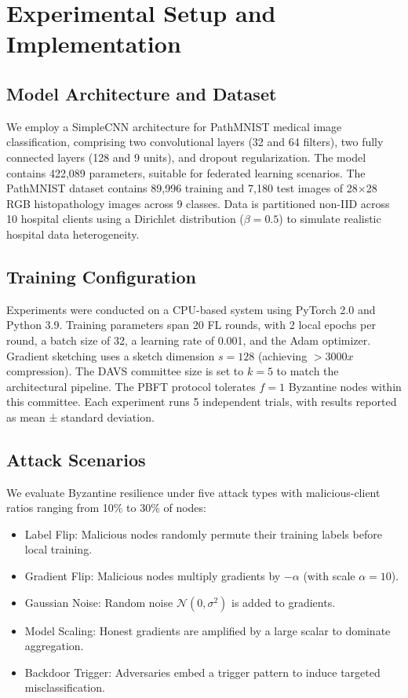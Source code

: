 \documentclass[conference]{IEEEtran}
\begin{document}
\section{Experimental Setup and Implementation}

\subsection{Model Architecture and Dataset}
We employ a SimpleCNN architecture for PathMNIST medical image classification, comprising two convolutional layers (32 and 64 filters), two fully connected layers (128 and 9 units), and dropout regularization. The model contains 422,089 parameters, suitable for federated learning scenarios. The PathMNIST dataset contains 89,996 training and 7,180 test images of 28$\times$28 RGB histopathology images across 9 classes. Data is partitioned non-IID across 10 hospital clients using a Dirichlet distribution ($\beta=0.5$) to simulate realistic hospital data heterogeneity.

\subsection{Training Configuration}
Experiments were conducted on a CPU-based system using PyTorch 2.0 and Python 3.9. Training parameters span 20 FL rounds, with 2 local epochs per round, a batch size of 32, a learning rate of 0.001, and the Adam optimizer. Gradient sketching uses a sketch dimension $s=128$ (achieving $>3000x$ compression). The DAVS committee size is set to $k=5$ to match the architectural pipeline. The PBFT protocol tolerates $f=1$ Byzantine nodes within this committee. Each experiment runs 5 independent trials, with results reported as mean ± standard deviation.

\subsection{Attack Scenarios}
We evaluate Byzantine resilience under five attack types with malicious-client ratios ranging from 10\% to 30\% of nodes:
\begin{itemize}
    \item Label Flip: Malicious nodes randomly permute their training labels before local training.
    \item Gradient Flip: Malicious nodes multiply gradients by $-\alpha$ (with scale $\alpha = 10$).
    \item Gaussian Noise: Random noise $\mathcal{N}(0, \sigma^2)$ is added to gradients.
    \item Model Scaling: Honest gradients are amplified by a large scalar to dominate aggregation.
    \item Backdoor Trigger: Adversaries embed a trigger pattern to induce targeted misclassification.
\end{itemize}
\end{document}
